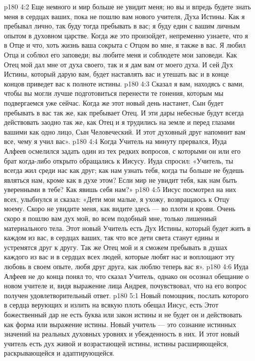 \vs p180 4:2 Еще немного и мир больше не увидит меня; но вы и впредь будете знать меня в сердцах ваших, пока не пошлю вам нового учителя, Духа Истины. Как я пребывал лично, так буду тогда пребывать в вас; я буду един с вашим личным опытом в духовном царстве. Когда же это произойдет, непременно узнаете, что я в Отце и что, хоть жизнь ваша сокрыта с Отцом во мне, я также в вас. Я любил Отца и соблюл его заповеди; вы любите меня и соблюдете мои заповеди. Как Отец мой дал мне от духа своего, так и я дам вам от моего духа. И сей Дух Истины, который дарую вам, будет наставлять вас и утешать вас и в конце концов приведет вас к полноте истины.
\vs p180 4:3 Сказал я вам, находясь с вами, чтобы вы могли лучше подготовиться перенести те гонения, которым мы подвергаемся уже сейчас. Когда же этот новый день настанет, Сын будет пребывать в вас так же, как пребывает Отец. И эти дары небесные будут всегда действовать заодно так же, как Отец и я трудились на земле и перед глазами вашими как одно лицо, Сын Человеческий. И этот духовный друг напомнит вам все, чему я учил вас».
\vs p180 4:4 Когда Учитель на минуту прервался, Иуда Алфеев осмелился задать один из тех редких вопросов, с которыми он или его брат когда\hyp{}либо открыто обращались к Иисусу. Иуда спросил: «Учитель, ты всегда жил среди нас как друг; как нам узнать тебя, когда ты больше не будешь являться нам, кроме как в духе этом? Если мир не увидит тебя, как нам быть уверенными в тебе? Как явишь себя нам?»
\vs p180 4:5 Иисус посмотрел на них всех, улыбнулся и сказал: «Дети мои малые, я ухожу, возвращаюсь к Отцу моему. Скоро не увидите меня, как видите здесь --- во плоти и крови. Очень скоро я пошлю вам дух мой, во всем подобный мне, только лишенный материального тела. Этот новый Учитель есть Дух Истины, который будет жить в каждом из вас, в сердцах ваших, так что все дети света станут едины и устремятся друг к другу. Так же Отец мой и я сможем пребывать в душах каждого из вас и в сердцах всех людей, которые любят нас и воплощают эту любовь в своем опыте, любя друг друга, как люблю теперь вас я».
\vs p180 4:6 Иуда Алфеев не до конца понял то, что сказал Учитель, однако он осознал обещание о новом учителе и, видя выражение лица Андрея, почувствовал, что на его вопрос получен удовлетворительный ответ.
\vs p180 5:1 Новый помощник, послать которого в сердца верующих и излить на всякую плоть обещал Иисус, есть  Этот божественный дар не есть буква или закон истины и не будет он и действовать как форма или выражение истины. Новый учитель --- это  сознание истинных значений на реальных духовных уровнях и убежденность в них. И этот новый учитель есть дух живой и возрастающей истины, истины расширяющейся, раскрывающейся и адаптирующейся.
